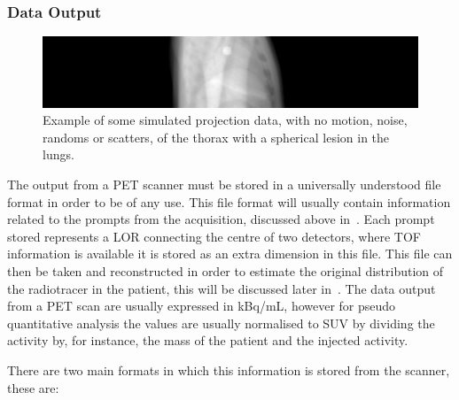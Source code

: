             \subsubsection{Data Output} \label{sec:data_output}
                \begin{figure}
                    \centering
                    
                    \includegraphics[width=1.0\linewidth]{figures/background_projection_data_example.png}
                    
                    \captionsetup{singlelinecheck=false, justification=raggedright}
                    \caption{Example of some simulated projection data, with no motion, noise, randoms or scatters, of the thorax with a spherical lesion in the lungs.} \label{fig:data_output_projection_data_example}
                \end{figure}
                
                The output from a \gls{PET} scanner must be stored in a universally understood file format in order to be of any use. This file format will usually contain information related to the prompts from the acquisition, discussed above in~. Each prompt stored represents a \gls{LOR} connecting the centre of two detectors, where \gls{TOF} information is available it is stored as an extra dimension in this file. This file can then be taken and reconstructed in order to estimate the original distribution of the radiotracer in the patient, this will be discussed later in~. The data output from a \gls{PET} scan are usually expressed in \gls{kBq/mL}, however for pseudo quantitative analysis the values are usually normalised to \gls{SUV} by dividing the activity by, for instance, the mass of the patient and the injected activity.
                
                There are two main formats in which this information is stored from the scanner, these are:
                
